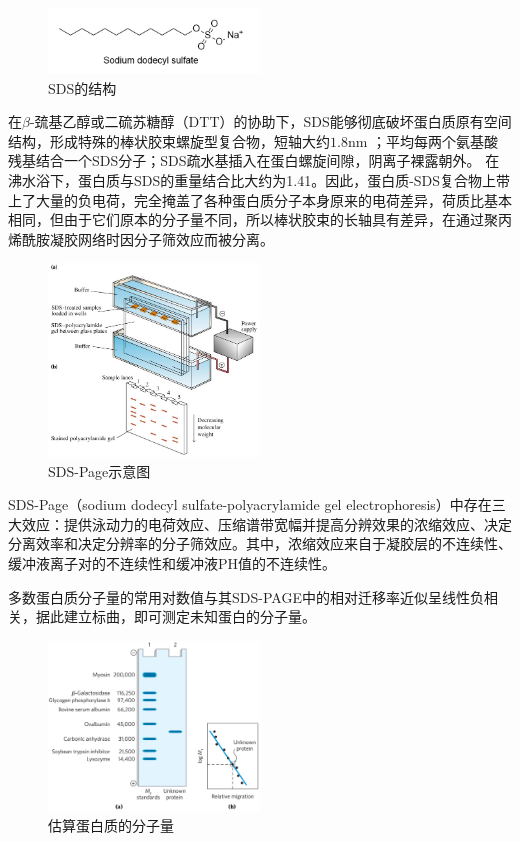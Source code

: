 \begin{figure}[H]
    \centering
    \includegraphics[width = 0.5\textwidth]{figure/Some Pictures/SDS.png}
    \caption{SDS的结构}
    \label{fig:enter-label}
\end{figure}

在$\beta$-巯基乙醇或二硫苏糖醇（DTT）的协助下，SDS能够彻底破坏蛋白质原有空间结构，形成特殊的棒状胶束螺旋型复合物，短轴大约$1.8\mathrm{nm}$ ；平均每两个氨基酸残基结合一个SDS分子；SDS疏水基插入在蛋白螺旋间隙，阴离子裸露朝外。
在沸水浴下，蛋白质与SDS的重量结合比大约为1.41。因此，蛋白质-SDS复合物上带上了大量的负电荷，完全掩盖了各种蛋白质分子本身原来的电荷差异，荷质比基本相同，但由于它们原本的分子量不同，所以棒状胶束的长轴具有差异，在通过聚丙烯酰胺凝胶网络时因分子筛效应而被分离。

\begin{figure}[H]
    \centering
    \includegraphics[width = 0.5\textwidth]{figure/Some Pictures/SDS-PAGE简图.png}
    \caption{SDS-Page示意图}
    \label{fig:enter-label}
\end{figure}

SDS-Page（sodium dodecyl sulfate-polyacrylamide gel electrophoresis）中存在三大效应：提供泳动力的电荷效应、压缩谱带宽幅并提高分辨效果的浓缩效应、决定分离效率和决定分辨率的分子筛效应。其中，浓缩效应来自于凝胶层的不连续性、缓冲液离子对的不连续性和缓冲液PH值的不连续性。

多数蛋白质分子量的常用对数值与其SDS-PAGE中的相对迁移率近似呈线性负相关，据此建立标曲，即可测定未知蛋白的分子量。
\begin{figure}[H]
    \centering
    \includegraphics[width = 0.5\textwidth]{figure/Some Pictures/Estimating the molecular weight of a protein.png}
    \caption{估算蛋白质的分子量\cite{nelson2021lehninger}}
    \label{fig:enter-label}
\end{figure}

